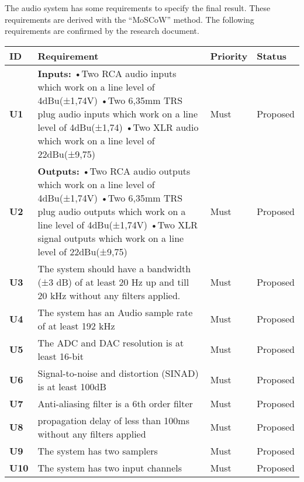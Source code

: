 The audio system has some requirements to specify the final result. 
These requirements are derived with the “MoSCoW” method. 
The following requirements are confirmed by the research document.

\newpage
\begin{longtable}{|l|p{10cm}|l|l|}
	\hline
	\textbf{ID} & \textbf{Requirement} & \textbf{Priority} & \textbf{Status}\\ \hline 
	\textbf{U1} & \textbf{Inputs:} \newline
	•Two RCA audio inputs which work on a line level of 4dBu(±1,74V)\newline
	•Two 6,35mm TRS plug audio inputs which work on a line level of 4dBu(±1,74)\newline
	•Two XLR audio which work on a line level of 22dBu(±9,75) 																	& Must	 & Proposed\\ \hline
	\textbf{U2} & \textbf{Outputs:} \newline
	•Two RCA audio outputs which work on a line level of 4dBu(±1,74V)\newline
	•Two 6,35mm TRS plug audio outputs which work on a line level of 4dBu(±1,74V)\newline
	•Two XLR signal outputs which work on a line level of 22dBu(±9,75)															& Must 	 & Proposed\\ \hline
	\textbf{U3} &The system should have a bandwidth (±3 dB) of at least 20 Hz up and till 20 kHz without any filters applied. 	& Must   & Proposed\\ \hline
	\textbf{U4} &The system has an Audio sample rate of at least 192 kHz 														& Must   & Proposed\\ \hline
	\textbf{U5} &The ADC and DAC resolution is at least 16-bit 																	& Must   & Proposed\\ \hline
	\textbf{U6} &Signal-to-noise and distortion (SINAD) is at least 100dB  														& Must   & Proposed\\ \hline
	\textbf{U7} &Anti-aliasing filter is a 6th order filter										 								& Must   & Proposed\\ \hline
	\textbf{U8} &propagation delay of less than 100ms without any filters applied												& Must   & Proposed\\ \hline
	\textbf{U9} &The system has two samplers											 										& Must   & Proposed\\ \hline
	\textbf{U10}&The system has two input channels 																				& Must   & Proposed\\ \hline

\end{longtable}
